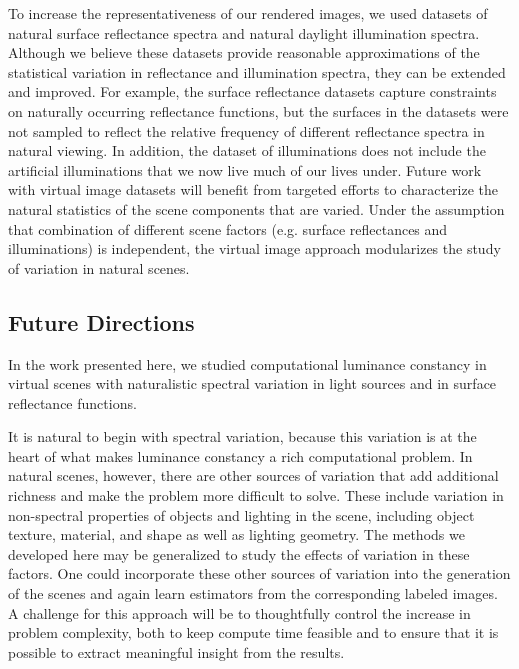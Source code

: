\documentclass{jov}
\begin{document}
To increase the representativeness of our rendered images, we used datasets of  natural surface reflectance spectra and natural daylight illumination spectra.
Although we believe these datasets provide reasonable approximations of the statistical variation in reflectance and illumination spectra, they can be extended and improved.
For example, the surface reflectance datasets capture constraints on naturally occurring reflectance functions, but the surfaces in the datasets were not sampled to reflect the relative frequency of different reflectance spectra in natural viewing. 
In addition, the dataset of illuminations does not include the artificial illuminations that we now live much of our lives under.
Future work with virtual image datasets will benefit from targeted efforts to characterize the natural statistics of the scene components that are varied.
Under the assumption that combination of different scene factors (e.g. surface reflectances and illuminations) is independent, the virtual image approach modularizes the study of variation in natural scenes. 

\subsection{Future Directions}
In the work presented here, we studied computational luminance constancy in virtual scenes with naturalistic spectral variation in light sources and in surface reflectance functions. 

It is natural to begin with spectral variation, because this variation is at the heart of what makes luminance constancy a rich computational problem.
In natural scenes, however, there are other sources of variation that add additional richness and make the problem more difficult to solve.
These include variation in non-spectral properties of objects and lighting in the scene, including object texture, material, and shape as well as lighting geometry. 
The methods we developed here may be generalized to study the effects of variation in these factors.
One could incorporate these other sources of variation into the generation of the scenes and again learn estimators from the corresponding labeled images. 
A challenge for this approach will be to thoughtfully control the increase in problem complexity, both to keep compute time feasible and to ensure that it is possible to extract meaningful insight from the results.
\end{document}
